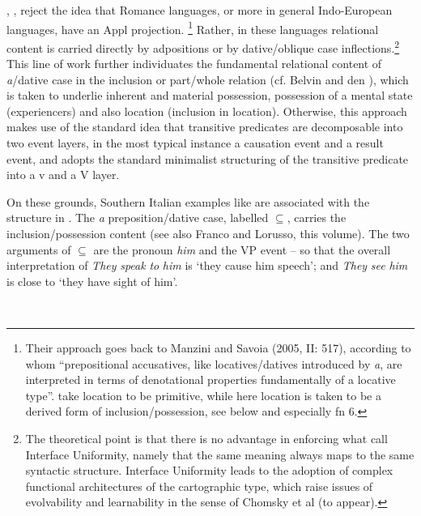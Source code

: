 \documentclass[output=paper]{langscibook}
\begin{document}
\citet{ManziniSavoia2010}, \citet{Manzini2012}, \citet{ManziniFranco2016} reject the idea that Romance languages, or more in general Indo-European languages, have an Appl projection.{} \footnote{Their approach goes back to Manzini and Savoia (2005, II: 517), according to whom “prepositional accusatives, like locatives/datives introduced by \textit{a}, are interpreted in terms of denotational properties fundamentally of a locative type”. \citet{ManziniSavoia2005} take location to be primitive, while here location is taken to be a derived form of inclusion/possession, see below and especially fn 6.}   Rather, in these languages relational content is carried directly by adpositions or by dative/oblique case inflections.\footnote{The theoretical point is that there is no advantage in enforcing what \citet{CulicoverJackendoff2005} call Interface Uniformity, namely that the same meaning always maps to the same syntactic structure. Interface Uniformity leads to the adoption of complex functional architectures of the cartographic type, which raise issues of evolvability and learnability in the sense of Chomsky et al (to appear).} This line of work further individuates the fundamental relational content of \textit{a}/dative case in the inclusion or part/whole relation (cf. Belvin and den \citealt{Dikken1997}), which is taken to underlie inherent and material possession, possession of a mental state (experiencers) and also location (inclusion in location). Otherwise, this approach makes use of the standard idea that transitive predicates are decomposable into two event layers, in the most typical instance a causation event and a result event, and adopts the standard minimalist structuring of the transitive predicate into a v and a V layer. 

On these grounds, Southern Italian examples like  are associated with the structure in . The \textit{a} preposition/dative case, labelled  ${\subseteq}$, carries the inclusion/possession content (see also Franco and Lorusso, this volume). The two arguments of ${\subseteq}$ are the pronoun \textit{him} and the VP event – so that the overall interpretation of \textit{They} \textit{speak} \textit{to} \textit{him} is ‘they cause him speech’; and \textit{They} \textit{see} \textit{him} is close to ‘they have sight of him’.  

\ea\label{ex:key:}
{}\\
\z
\end{document}

